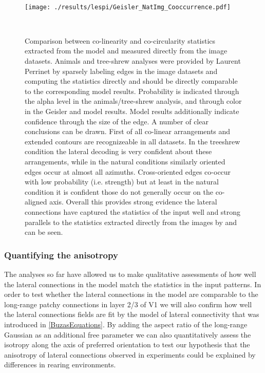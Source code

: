 \begin{figure}
  \begin{minipage}[t]{0.67\textwidth}
    \mbox{}\\[-\baselineskip]    \texttt{[image: ./results/lespi/Geisler\_NatImg\_Cooccurrence.pdf]}
  \end{minipage}\hfill
  \begin{minipage}[t]{0.3\textwidth}
    \mbox{}\\[-\baselineskip]
	\caption{Comparison between co-linearity and co-circularity
      statistics extracted from the model and measured directly from
      the image datasets. Animals and tree-shrew analyses were
      provided by Laurent Perrinet by sparsely labeling edges in the
      image datasets and computing the statistics directly and should
      be directly comparable to the corresponding model
      results. Probability is indicated through the alpha level in the
      animals/tree-shrew analysis, and through color in the Geisler
      and model results. Model results additionally indicate
      confidence through the size of the edge. A number of clear
      conclusions can be drawn. First of all co-linear arrangements
      and extended contours are recognizeable in all datasets. In the
      treeshrew condition the lateral decoding is very confident about
      these arrangements, while in the natural conditions similarly
      oriented edges occur at almost all azimuths. Cross-oriented
      edges co-occur with low probability (i.e. strength) but at least
      in the natural condition it is confident those do not generally
      occur on the co-aligned axis. Overall this provides strong
      evidence the lateral connections have captured the statistics of
      the input well and strong parallels to the statistics extracted
      directly from the images by \cite{Geisler2001} and
      \cite{Perrinet2015} can be seen.}
	\label{NatImgGeisler}
    \end{minipage}
\end{figure}

\subsubsection*{Quantifying the anisotropy}

The analyses so far have allowed us to make qualitative assessments of
how well the lateral connections in the model match the statistics in
the input patterns. In order to test whether the lateral connections
in the model are comparable to the long-range patchy connections in
layer 2/3 of V1 we will also confirm how well the lateral connections
fields are fit by the \cite{Buzas2006} model of lateral connectivity
that was introduced in \ref{BuzasEquations}. By adding the aspect
ratio of the long-range Gaussian as an additional free parameter we
can also quantitatively assess the isotropy along the axis of
preferred orientation to test our hypothesis that the anisotropy of
lateral connections observed in experiments \citep{Bosking1997} could
be explained by differences in rearing environments.

